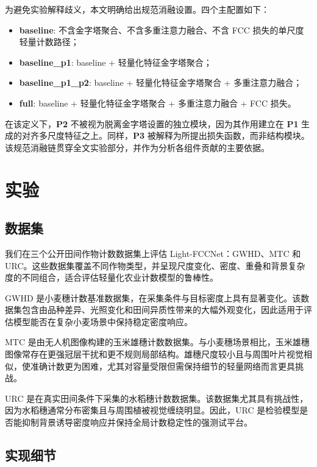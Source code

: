 \documentclass[a4paper,fleqn]{cas-sc}
\begin{document}
为避免实验解释歧义，本文明确给出规范消融设置。四个主配置如下：
\begin{itemize}
    \item \textbf{baseline}: 不含金字塔聚合、不含多重注意力融合、不含 FCC 损失的单尺度轻量计数路径；
    \item \textbf{baseline\_p1}: baseline + 轻量化特征金字塔聚合；
    \item \textbf{baseline\_p1\_p2}: baseline + 轻量化特征金字塔聚合 + 多重注意力融合；
    \item \textbf{full}: baseline + 轻量化特征金字塔聚合 + 多重注意力融合 + FCC 损失。
\end{itemize}

在该定义下，\textbf{P2} 不被视为脱离金字塔设置的独立模块，因为其作用建立在 \textbf{P1} 生成的对齐多尺度特征之上。同样，\textbf{P3} 被解释为所提出损失函数，而非结构模块。该规范消融链贯穿全文实验部分，并作为分析各组件贡献的主要依据。

\section{实验}

\subsection{数据集}

我们在三个公开田间作物计数数据集上评估 Light-FCCNet：GWHD、MTC 和 URC。这些数据集覆盖不同作物类型，并呈现尺度变化、密度、重叠和背景复杂度的不同组合，适合评估轻量化农业计数模型的鲁棒性。

GWHD 是小麦穗计数基准数据集，在采集条件与目标密度上具有显著变化。该数据集包含由品种差异、光照变化和田间异质性带来的大幅外观变化，因此适用于评估模型能否在复杂小麦场景中保持稳定密度响应。

MTC 是由无人机图像构建的玉米雄穗计数数据集。与小麦穗场景相比，玉米雄穗图像常存在更强冠层干扰和更不规则局部结构。雄穗尺度较小且与周围叶片视觉相似，使准确计数更为困难，尤其对容量受限但需保持细节的轻量网络而言更具挑战。

URC 是在真实田间条件下采集的水稻穗计数数据集。该数据集尤其具有挑战性，因为水稻穗通常分布密集且与周围植被视觉缠绕明显。因此，URC 是检验模型是否能抑制背景诱导密度响应并保持全局计数稳定性的强测试平台。

\subsection{实现细节}
\end{document}
